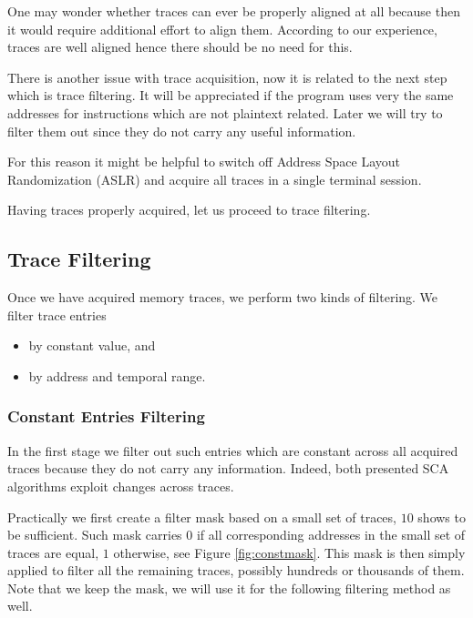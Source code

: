 One may wonder whether traces can ever be properly aligned at all because then it would require additional effort to align them. According to our experience, traces are well aligned hence there should be no need for this.

\begin{note}
\label{note:aslr}
	There is another issue with trace acquisition, now it is related to the next step which is trace filtering. It will be appreciated if the program uses very the same addresses for instructions which are not plaintext related. Later we will try to filter them out since they do not carry any useful information.
	
	For this reason it might be helpful to switch off Address Space Layout Randomization (ASLR) and acquire all traces in a single terminal session.
\end{note}

Having traces properly acquired, let us proceed to trace filtering.



\subsection{Trace Filtering}
\label{sec:filter}

Once we have acquired memory traces, we perform two kinds of filtering. We filter trace entries
\begin{itemize}
	\item by constant value, and
	\item by address and temporal range.
\end{itemize}

\subsubsection{Constant Entries Filtering}
	
	In the first stage we filter out such entries which are constant across all acquired traces because they do not carry any information. Indeed, both presented SCA algorithms exploit changes across traces.
	
	Practically we first create a filter mask based on a small set of traces, $10$ shows to be sufficient. Such mask carries $0$ if all corresponding addresses in the small set of traces are equal, $1$ otherwise, see Figure \ref{fig:constmask}. This mask is then simply applied to filter all the remaining traces, possibly hundreds or thousands of them. Note that we keep the mask, we will use it for the following filtering method as well.
	
